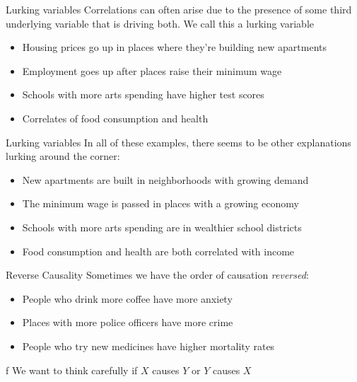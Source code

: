 \documentclass[aspectratio=169,t,11pt,table]{beamer}
\begin{document}
\begin{frame}{Lurking variables}
  Correlations can often arise due to the presence of some third underlying variable that is driving both. We call this a \alert{lurking variable}
  \begin{itemize}
    \item Housing prices go up in places where they're building new apartments
    
    \item Employment goes up after places raise their minimum wage
    
    \item Schools with more arts spending have higher test scores
    
    \item Correlates of food consumption and health
    
  \end{itemize}
\end{frame}

\begin{frame}{Lurking variables}
  In all of these examples, there seems to be other explanations \alert{lurking around the corner}:
  \begin{itemize}
    \item New apartments are built in neighborhoods with growing demand
    
    \item The minimum wage is passed in places with a growing economy
    
    \item Schools with more arts spending are in wealthier school districts
    
    \item Food consumption and health are both correlated with income
    
  \end{itemize}
\end{frame}

\begin{frame}{Reverse Causality}
  Sometimes we have the order of causation \emph{reversed}:
  \begin{itemize}
    \item People who drink more coffee have more anxiety
    
    \item Places with more police officers have more crime 
    
    \item People who try new medicines have higher mortality rates
  \end{itemize}
 f
  \bigskip
  We want to think carefully if $X$ causes $Y$ or $Y$ causes $X$
\end{frame}
\end{document}
